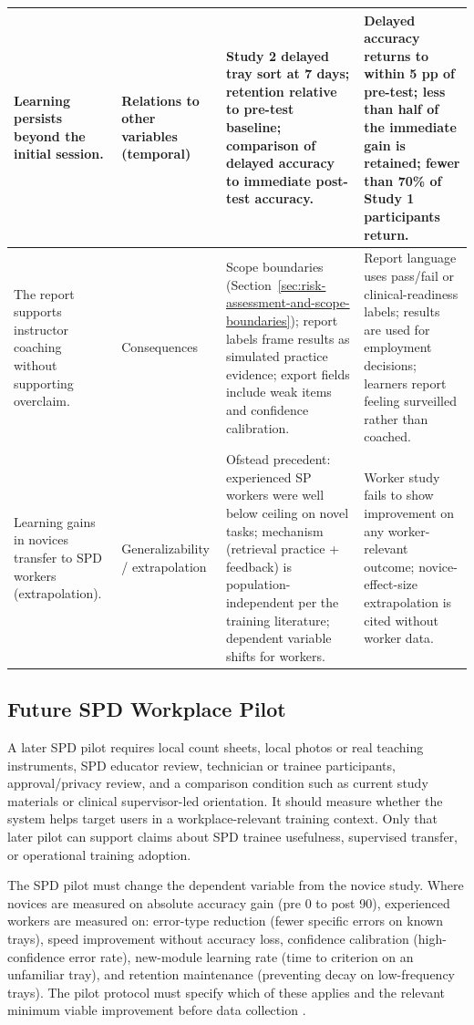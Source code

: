 \documentclass[10pt,a4paper]{article}
\begin{document}
\begin{table}[H]
\begin{tabularx}{\textwidth}{|>{\raggedright\arraybackslash}X|>{\raggedright\arraybackslash}X|>{\raggedright\arraybackslash}X|>{\raggedright\arraybackslash}X|}
\hline
Learning persists beyond the initial session. & Relations to other variables (temporal) & Study 2 delayed tray sort at 7 days; retention relative to pre-test baseline; comparison of delayed accuracy to immediate post-test accuracy. & Delayed accuracy returns to within 5 pp of pre-test; less than half of the immediate gain is retained; fewer than 70\% of Study 1 participants return. \\
\hline
The report supports instructor coaching without supporting overclaim. & Consequences & Scope boundaries (Section~\ref{sec:risk-assessment-and-scope-boundaries}); report labels frame results as simulated practice evidence; export fields include weak items and confidence calibration. & Report language uses pass/fail or clinical-readiness labels; results are used for employment decisions; learners report feeling surveilled rather than coached. \\
\hline
Learning gains in novices transfer to SPD workers (extrapolation). & Generalizability / extrapolation & Ofstead precedent: experienced SP workers were well below ceiling on novel tasks; mechanism (retrieval practice + feedback) is population-independent per the training literature; dependent variable shifts for workers. & Worker study fails to show improvement on any worker-relevant outcome; novice-effect-size extrapolation is cited without worker data. \\
\hline
\end{tabularx}
\end{table}
\subsection{Future SPD Workplace Pilot}


A later SPD pilot requires local count sheets, local photos or real teaching
instruments, SPD educator review, technician or trainee participants,
approval/privacy review, and a comparison condition such as current study
materials or clinical supervisor-led orientation. It should measure whether the system
helps target users in a workplace-relevant training context. Only that later
pilot can support claims about SPD trainee usefulness, supervised transfer, or
operational training adoption.

The SPD pilot must change the dependent variable from the novice study. Where
novices are measured on absolute accuracy gain (pre 0 to post 90), experienced
workers are measured on: error-type reduction (fewer specific errors on known
trays), speed improvement without accuracy loss, confidence calibration
(high-confidence error rate), new-module learning rate (time to criterion on
an unfamiliar tray), and retention maintenance (preventing decay on
low-frequency trays). The pilot protocol must specify which of these applies
and the relevant minimum viable improvement before data collection
\cite{kirkpatrick-evaluation-1994, arthur-et-al-2003}.
\end{document}
